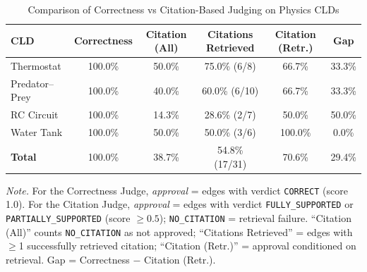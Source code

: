 \begin{table}[htbp]
\centering
\begin{threeparttable}
\caption{Comparison of Correctness vs Citation-Based Judging on Physics CLDs}
\label{tab:physics-comparison-enhanced}
\begin{tabular}{lccccc}
\toprule
\textbf{CLD} & \textbf{Correctness} & \textbf{Citation (All)} & \textbf{Citations Retrieved} & \textbf{Citation (Retr.)} & \textbf{Gap} \\
\midrule
Thermostat & 100.0\% & 50.0\% & 75.0\% (6/8) & 66.7\% & 33.3\% \\
Predator--Prey & 100.0\% & 40.0\% & 60.0\% (6/10) & 66.7\% & 33.3\% \\
RC Circuit & 100.0\% & 14.3\% & 28.6\% (2/7) & 50.0\% & 50.0\% \\
Water Tank & 100.0\% & 50.0\% & 50.0\% (3/6) & 100.0\% & 0.0\% \\
\midrule
\textbf{Total} & 100.0\% & 38.7\% & 54.8\% (17/31) & 70.6\% & 29.4\% \\
\bottomrule
\end{tabular}
\begin{tablenotes}
\small
\item \textit{Note.} For the Correctness Judge, \emph{approval} = edges with verdict \texttt{CORRECT} (score 1.0). For the Citation Judge, \emph{approval} = edges with verdict \texttt{FULLY\_SUPPORTED} or \texttt{PARTIALLY\_SUPPORTED} (score $\ge 0.5$); \texttt{NO\_CITATION} = retrieval failure. ``Citation (All)'' counts \texttt{NO\_CITATION} as not approved; ``Citations Retrieved'' = edges with $\ge$1 successfully retrieved citation; ``Citation (Retr.)'' = approval conditioned on retrieval. Gap = Correctness $-$ Citation (Retr.).
\end{tablenotes}
\end{threeparttable}
\end{table}
